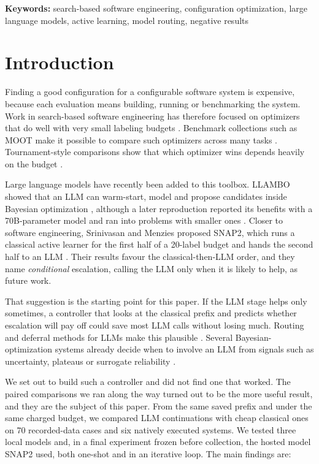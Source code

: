 \noindent\textbf{Keywords:} search-based software engineering, configuration optimization, large language models, active learning, model routing, negative results

\section{Introduction}

Finding a good configuration for a configurable software system is expensive, because each evaluation means building, running or benchmarking the system. Work in search-based software engineering has therefore focused on optimizers that do well with very small labeling budgets \cite{harman2001sbse,nair2020flash,menzies2026ezr}. Benchmark collections such as MOOT make it possible to compare such optimizers across many tasks \cite{menzies2025moot}. Tournament-style comparisons show that which optimizer wins depends heavily on the budget \cite{ganguly2026tournament}.

Large language models have recently been added to this toolbox. LLAMBO showed that an LLM can warm-start, model and propose candidates inside Bayesian optimization \cite{liu2024llambo}, although a later reproduction reported its benefits with a 70B-parameter model and ran into problems with smaller ones \cite{rychert2025reproduction}. Closer to software engineering, Srinivasan and Menzies proposed SNAP2, which runs a classical active learner for the first half of a 20-label budget and hands the second half to an LLM \cite{srinivasan2026snap2}. Their results favour the classical-then-LLM order, and they name \emph{conditional} escalation, calling the LLM only when it is likely to help, as future work.

That suggestion is the starting point for this paper. If the LLM stage helps only sometimes, a controller that looks at the classical prefix and predicts whether escalation will pay off could save most LLM calls without losing much. Routing and deferral methods for LLMs make this plausible \cite{chen2023frugalgpt,ong2024routellm,mozannar2020defer}. Several Bayesian-optimization systems already decide when to involve an LLM from signals such as uncertainty, plateaus or surrogate reliability \cite{cisse2025bora,xu2026lbmcts,ngo2026lmabo}.

We set out to build such a controller and did not find one that worked. The paired comparisons we ran along the way turned out to be the more useful result, and they are the subject of this paper. From the same saved prefix and under the same charged budget, we compared LLM continuations with cheap classical ones on 70 recorded-data cases and six natively executed systems. We tested three local models and, in a final experiment frozen before collection, the hosted model SNAP2 used, both one-shot and in an iterative loop. The main findings are:

